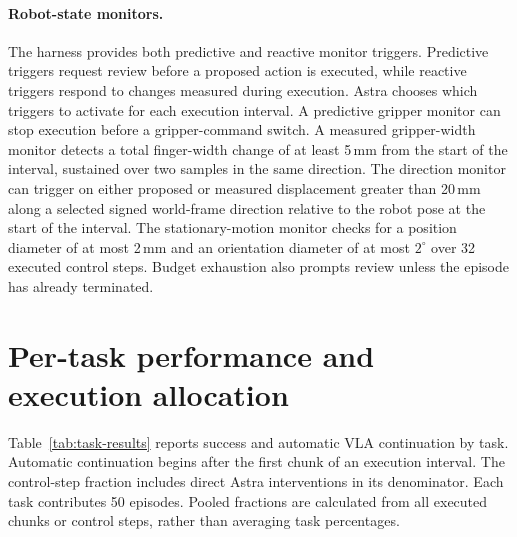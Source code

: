 \paragraph{Robot-state monitors.}
The harness provides both predictive and reactive monitor triggers. Predictive triggers request review before a proposed action is executed, while reactive triggers respond to changes measured during execution. Astra chooses which triggers to activate for each execution interval. A predictive gripper monitor can stop execution before a gripper-command switch. A measured gripper-width monitor detects a total finger-width change of at least 5\,mm from the start of the interval, sustained over two samples in the same direction. The direction monitor can trigger on either proposed or measured displacement greater than 20\,mm along a selected signed world-frame direction relative to the robot pose at the start of the interval. The stationary-motion monitor checks for a position diameter of at most 2\,mm and an orientation diameter of at most $2^\circ$ over 32 executed control steps. Budget exhaustion also prompts review unless the episode has already terminated.

\section{Per-task performance and execution allocation}
\label{app:task-results}
Table~\ref{tab:task-results} reports success and automatic VLA continuation by task. Automatic continuation begins after the first chunk of an execution interval. The control-step fraction includes direct Astra interventions in its denominator. Each task contributes 50 episodes. Pooled fractions are calculated from all executed chunks or control steps, rather than averaging task percentages.


